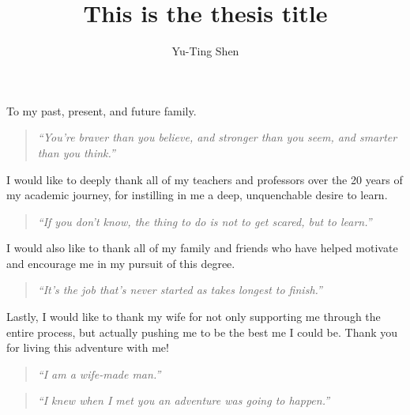 \documentclass[hyperlinks]{outhesis}
\begin{document}
\author{Yu-Ting Shen}
\title{This is the thesis title}
\address{Norman, Oklahoma}

\begin{dedication}
To my past, present, and future family.

\begin{quotation}
\raggedright{\emph{``You're braver than you believe, and stronger than you seem, and smarter than you think.''}} \\
\end{quotation}

\end{dedication}

\begin{acknowledgements}
I would like to deeply thank all of my teachers and professors over the 20 years of my academic journey, for instilling in me a deep, unquenchable desire to learn. 
\begin{quotation}
\raggedright{\emph{``If you don't know, the thing to do is not to get scared, but to learn.''}} \\
\end{quotation}

I would also like to thank all of my family and friends who have helped motivate and encourage me in my pursuit of this degree. 
\begin{quotation}
\raggedright{\emph{``It's the job that's never started as takes longest to finish.''}} \\
\end{quotation}

Lastly, I would like to thank my wife for not only supporting me through the entire process, but actually pushing me to be the best me I could be. Thank you for living this adventure with me!
\begin{quotation}
\raggedright{\emph{``I am a wife-made man.''}} \\
\end{quotation}
\begin{quotation}
\raggedright{\emph{``I knew when I met you an adventure was going to happen.''}} \\
\end{quotation}
\end{acknowledgements}
\end{document}
